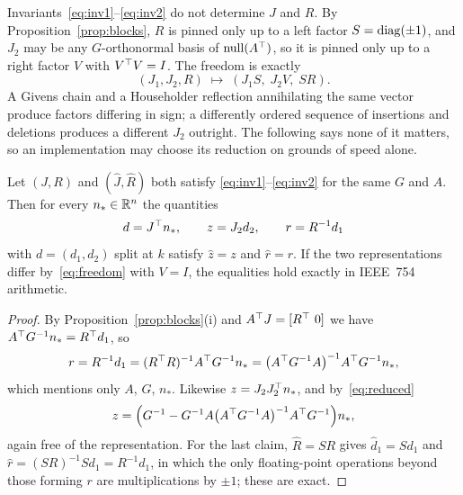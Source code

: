 Invariants~\eqref{eq:inv1}--\eqref{eq:inv2} do not determine $J$ and $R$. By
Proposition~\ref{prop:blocks}, $R$ is pinned only up to a left factor
$S = \operatorname{diag}(\pm1)$, and $J_2$ may be any $G$-orthonormal basis of $\operatorname{null}(A^{\top})$, so
it is pinned only up to a right factor $V$ with $V^{\top} V = I$. The freedom is exactly
\begin{equation}
  (J_1, J_2, R) \;\longmapsto\; (J_1 S,\; J_2 V,\; S R).
  \label{eq:freedom}
\end{equation}
A Givens chain and a Householder reflection annihilating the same vector produce
factors differing in sign; a differently ordered sequence of insertions and
deletions produces a different $J_2$ outright. The following says none of it
matters, so an implementation may choose its reduction on grounds of speed alone.

\begin{proposition}
\label{prop:invariance}
Let $(J,R)$ and $(\hat J,\hat R)$ both satisfy \eqref{eq:inv1}--\eqref{eq:inv2} for
the same $G$ and $A$. Then for every $n_* \in \mathbb{R}^n$ the quantities
\begin{equation}
  d = J^{\top} n_*, \qquad z = J_2 d_2, \qquad r = R^{-1} d_1
  \label{eq:dzr}
\end{equation}
with $d = (d_1,d_2)$ split at $k$ satisfy $\hat z = z$ and $\hat r = r$. If the two
representations differ by~\eqref{eq:freedom} with $V = I$, the equalities hold
exactly in IEEE~754 arithmetic.
\end{proposition}

\begin{proof}
By Proposition~\ref{prop:blocks}(i) and $A^{\top} J = [R^{\top}\ 0]$ we have
$A^{\top} G^{-1} n_* = R^{\top} d_1$, so
\begin{equation}
  r = R^{-1}d_1 = (R^{\top} R)^{-1} A^{\top} G^{-1} n_*
    = \bigl(A^{\top} G^{-1}A\bigr)^{-1} A^{\top} G^{-1} n_* ,
  \label{eq:rclosed}
\end{equation}
which mentions only $A$, $G$, $n_*$. Likewise $z = J_2 J_2^{\top} n_*$, and
by~\eqref{eq:reduced}
\begin{equation}
  z = \Bigl(G^{-1} - G^{-1}A\bigl(A^{\top} G^{-1}A\bigr)^{-1}A^{\top} G^{-1}\Bigr) n_*,
  \label{eq:zclosed}
\end{equation}
again free of the representation. For the last claim, $\hat R = SR$ gives
$\hat d_1 = S d_1$ and $\hat r = (SR)^{-1}Sd_1 = R^{-1}d_1$, in which the only
floating-point operations beyond those forming $r$ are multiplications by $\pm1$;
these are exact.
\end{proof}

